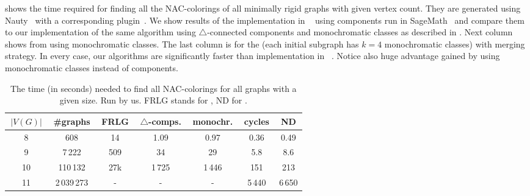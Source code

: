 shows the time required for finding all the NAC-colorings
of all minimally rigid graphs with given vertex count.
%
They are generated using Nauty~\cite{nauty}
with a corresponding plugin~\cite{nauty_plugin}.
%
We show results of the implementation
in \flexrilog{}~\cite{flexrilog} using \trcon{} components
run in SageMath~\cite{sagemath}
and compare them to our implementation of the same \Naive{} algorithm
using $\triangle$-connected components
and monochromatic classes as described in .
Next column shows \NaiveCycles{} from 
using monochromatic classes.
The last column is for the \NeighborsDegree{} (each initial subgraph has $k=4$ monochromatic classes)
with \MergeLinear{} merging strategy.
%
In every case, our algorithms are significantly faster than implementation in \flexrilog{}~\cite{flexrilog}.
Notice also huge advantage gained by using monochromatic classes instead of \trcon{} components.
%
\begin{table}[ht]
	\caption[Running times on graphs]{
		The time (in seconds) needed to find all NAC-colorings for all graphs with a given size. Run by us.
		\textsc{FRLG} stands for \flexrilog{}, \textsc{ND} for \NeighborsDegree{}.}%
	\label{tab:all_min_rigid}
	\centering
	\begin{tabular}{ccccccc}
		\hline
		\,$|V(G)|$\, & \,\#graphs\, & \,FRLG\, & \,$\triangle$-comps.\, & \,monochr.\, & \,cycles\, & \,\textsc{ND}\, \\
		\hline
		8            & 608          & 14       & 1.09                   & 0.97         & 0.36       & 0.49            \\
		9            & 7\,222       & 509      & 34                     & 29           & 5.8        & 8.6             \\
		10           & 110\,132     & 27k      & 1\,725                 & 1\,446       & 151        & 213             \\
		11           & 2\,039\,273  & -        & -                      & -            & 5\,440     & 6\,650          \\
		\hline
	\end{tabular}
\end{table}

